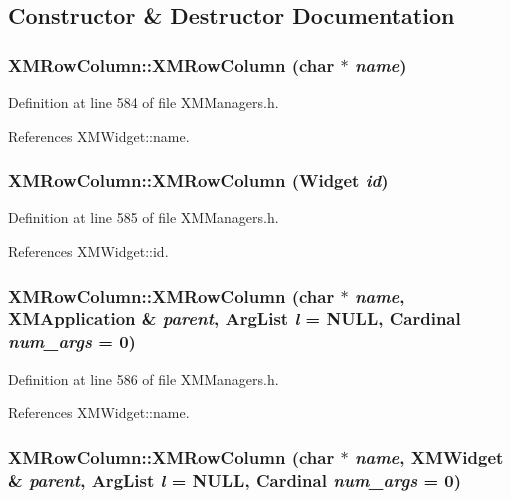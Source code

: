\subsection{Constructor \& Destructor Documentation}
\subsubsection{\setlength{\rightskip}{0pt plus 5cm}XMRow\-Column::XMRow\-Column (char $\ast$ {\em name})\hspace{0.3cm}{\tt  [inline]}}\label{classXMRowColumn_a0}




Definition at line 584 of file XMManagers.h.

References XMWidget::name.
\subsubsection{\setlength{\rightskip}{0pt plus 5cm}XMRow\-Column::XMRow\-Column (Widget {\em id})\hspace{0.3cm}{\tt  [inline]}}\label{classXMRowColumn_a1}




Definition at line 585 of file XMManagers.h.

References XMWidget::id.
\subsubsection{\setlength{\rightskip}{0pt plus 5cm}XMRow\-Column::XMRow\-Column (char $\ast$ {\em name}, {\bf XMApplication} \& {\em parent}, Arg\-List {\em l} = NULL, Cardinal {\em num\_\-args} = 0)\hspace{0.3cm}{\tt  [inline]}}\label{classXMRowColumn_a2}




Definition at line 586 of file XMManagers.h.

References XMWidget::name.
\subsubsection{\setlength{\rightskip}{0pt plus 5cm}XMRow\-Column::XMRow\-Column (char $\ast$ {\em name}, {\bf XMWidget} \& {\em parent}, Arg\-List {\em l} = NULL, Cardinal {\em num\_\-args} = 0)\hspace{0.3cm}{\tt  [inline]}}\label{classXMRowColumn_a3}





